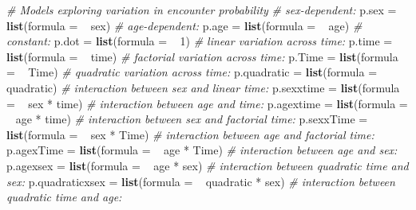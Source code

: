 \documentclass[]{article}
\newenvironment{Shaded}{\begin{snugshade}}{\end{snugshade}}
\newcommand{\KeywordTok}[1]{\textcolor[rgb]{0.13,0.29,0.53}{\textbf{{#1}}}}
\newcommand{\DataTypeTok}[1]{\textcolor[rgb]{0.13,0.29,0.53}{{#1}}}
\newcommand{\DecValTok}[1]{\textcolor[rgb]{0.00,0.00,0.81}{{#1}}}
\newcommand{\StringTok}[1]{\textcolor[rgb]{0.31,0.60,0.02}{{#1}}}
\newcommand{\CommentTok}[1]{\textcolor[rgb]{0.56,0.35,0.01}{\textit{{#1}}}}
\newcommand{\NormalTok}[1]{{#1}}
\begin{document}
\begin{Shaded}
\begin{Highlighting}[]
    \CommentTok{# Models exploring variation in encounter probability}
    \CommentTok{# sex-dependent:}
    \NormalTok{p.sex =}\StringTok{ }\KeywordTok{list}\NormalTok{(}\DataTypeTok{formula =}  \NormalTok{~}\StringTok{ }\NormalTok{sex) }
    \CommentTok{# age-dependent:}
    \NormalTok{p.age =}\StringTok{ }\KeywordTok{list}\NormalTok{(}\DataTypeTok{formula =}  \NormalTok{~}\StringTok{ }\NormalTok{age) }
    \CommentTok{# constant:}
    \NormalTok{p.dot =}\StringTok{ }\KeywordTok{list}\NormalTok{(}\DataTypeTok{formula =}  \NormalTok{~}\StringTok{ }\DecValTok{1}\NormalTok{) }
    \CommentTok{# linear variation across time:}
    \NormalTok{p.time =}\StringTok{ }\KeywordTok{list}\NormalTok{(}\DataTypeTok{formula =}  \NormalTok{~}\StringTok{ }\NormalTok{time) }
    \CommentTok{# factorial variation across time:}
    \NormalTok{p.Time =}\StringTok{ }\KeywordTok{list}\NormalTok{(}\DataTypeTok{formula =}  \NormalTok{~}\StringTok{ }\NormalTok{Time) }
    \CommentTok{# quadratic variation across time:}
    \NormalTok{p.quadratic =}\StringTok{ }\KeywordTok{list}\NormalTok{(}\DataTypeTok{formula =}  \NormalTok{~}\StringTok{ }\NormalTok{quadratic) }
    \CommentTok{# interaction between sex and linear time:}
    \NormalTok{p.sexxtime =}\StringTok{ }\KeywordTok{list}\NormalTok{(}\DataTypeTok{formula =}  \NormalTok{~}\StringTok{ }\NormalTok{sex *}\StringTok{ }\NormalTok{time) }
    \CommentTok{# interaction between age and time:}
    \NormalTok{p.agextime =}\StringTok{ }\KeywordTok{list}\NormalTok{(}\DataTypeTok{formula =}  \NormalTok{~}\StringTok{ }\NormalTok{age *}\StringTok{ }\NormalTok{time)}
    \CommentTok{# interaction between sex and factorial time:}
    \NormalTok{p.sexxTime =}\StringTok{ }\KeywordTok{list}\NormalTok{(}\DataTypeTok{formula =}  \NormalTok{~}\StringTok{ }\NormalTok{sex *}\StringTok{ }\NormalTok{Time)}
    \CommentTok{# interaction between age and factorial time:}
    \NormalTok{p.agexTime =}\StringTok{ }\KeywordTok{list}\NormalTok{(}\DataTypeTok{formula =}  \NormalTok{~}\StringTok{ }\NormalTok{age *}\StringTok{ }\NormalTok{Time)}
    \CommentTok{# interaction between age and sex:}
    \NormalTok{p.agexsex =}\StringTok{ }\KeywordTok{list}\NormalTok{(}\DataTypeTok{formula =}  \NormalTok{~}\StringTok{ }\NormalTok{age *}\StringTok{ }\NormalTok{sex)}
    \CommentTok{# interaction between quadratic time and sex:}
    \NormalTok{p.quadraticxsex =}\StringTok{ }\KeywordTok{list}\NormalTok{(}\DataTypeTok{formula =}  \NormalTok{~}\StringTok{ }\NormalTok{quadratic *}\StringTok{ }\NormalTok{sex)}
    \CommentTok{# interaction between quadratic time and age:}

\end{Highlighting}
\end{Shaded}
\end{document}
